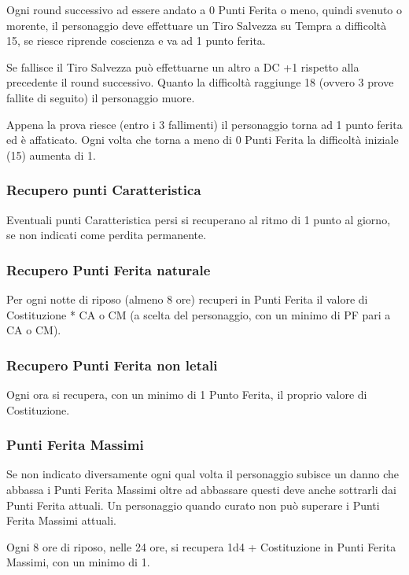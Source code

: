 \begin{multicols}{2}
Ogni round successivo ad essere andato a 0 Punti Ferita o meno, quindi svenuto o morente, il personaggio deve effettuare un Tiro Salvezza su Tempra a difficoltà 15, se riesce riprende coscienza e va ad 1 punto ferita.

Se fallisce il Tiro Salvezza può effettuarne un altro a DC +1 rispetto alla precedente il round successivo. Quanto la difficoltà raggiunge 18 (ovvero 3 prove fallite di seguito) il personaggio muore.

Appena la prova riesce (entro i 3 fallimenti) il personaggio torna ad 1 punto ferita ed è affaticato. Ogni volta che torna a meno di 0 Punti Ferita la difficoltà iniziale (15) aumenta di 1.

\subsubsection{Recupero punti Caratteristica}\label{recuperopunticcaratteristica}

Eventuali punti Caratteristica persi si recuperano al ritmo di 1 punto al giorno, se non indicati come perdita permanente.

\subsubsection{Recupero Punti Ferita naturale}\label{recuperopuntiferitanaturale}

Per ogni notte di riposo (almeno 8 ore) recuperi in Punti Ferita il valore di Costituzione * CA o CM (a scelta del personaggio, con un minimo di PF pari a CA o CM).

\subsubsection{Recupero Punti Ferita non letali}\label{recuperopuntiferitanonletali}\hypertarget{recuperopuntiferitanonletali}{}

Ogni ora si recupera, con un minimo di 1 Punto Ferita, il proprio valore di Costituzione.

\subsubsection{Punti Ferita Massimi}\label{puntiferitamassimi}

Se non indicato diversamente ogni qual volta il personaggio subisce un danno che abbassa i Punti Ferita Massimi oltre ad abbassare questi deve anche sottrarli dai Punti Ferita attuali. Un personaggio quando curato non può superare i Punti Ferita Massimi attuali.

Ogni 8 ore di riposo, nelle 24 ore, si recupera 1d4 + Costituzione in Punti Ferita Massimi, con un minimo di 1.

\end{multicols}

